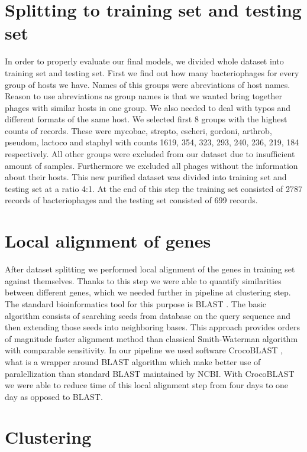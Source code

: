 \section{Splitting to training set and testing set}
In order to properly evaluate our final models, we divided whole dataset into training set and testing set.
First we find out how many bacteriophages for every group of hosts we have. 
Names of this groups were abreviations of host names.
Reason to use abreviations as group names is that we wanted bring together phages with similar hosts in one group.
We also needed to deal with typos and different formats of the same host.
We selected first 8 groups with the highest counts of records.
These were mycobac, strepto, escheri, gordoni, arthrob, pseudom, lactoco and staphyl with counts 1619, 354, 323, 293, 240, 236, 219, 184 respectively.
All other groups were excluded from our dataset due to insufficient amount of samples.
Furthermore we excluded all phages without the information about their hosts.
This new purified dataset was divided into training set and testing set at a ratio 4:1.
At the end of this step the training set consisted of 2787 records of bacteriophages and the testing set consisted of 699 records.

\section{Local alignment of genes}
After dataset splitting we performed local alignment of the genes in training set against themselves.
Thanks to this step we were able to quantify similarities between different genes, which we needed further in pipeline at clustering step.
The standard bioinformatics tool for this purpose is BLAST \cite{blast}. 
The basic algorithm consists of searching seeds from database on the query sequence and then extending those seeds into neighboring bases.
This approach provides orders of magnitude faster alignment method than classical Smith-Waterman algorithm \cite{smith_waterman} with comparable sensitivity.
In our pipeline we used software CrocoBLAST \cite{crocoblast}, what is a wrapper around BLAST algorithm which make better use of paralellization than standard BLAST maintained by NCBI.
With CrocoBLAST we were able to reduce time of this local alignment step from four days to one day as opposed to BLAST.

\section{Clustering}
